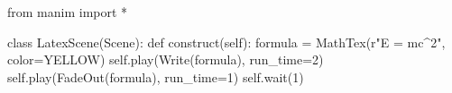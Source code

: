 
from manim import *

class LatexScene(Scene):
    def construct(self):
        formula = MathTex(r"E = mc^2", color=YELLOW)
        self.play(Write(formula), run_time=2)
        self.play(FadeOut(formula), run_time=1)
        self.wait(1)
